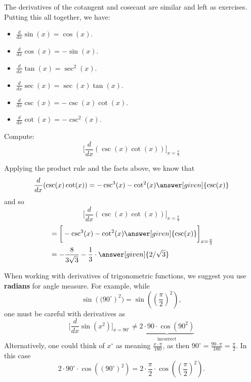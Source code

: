 \documentclass{ximera}
\begin{document}
The derivatives of the cotangent and cosecant are similar and left as
exercises.  Putting this all together, we have:

\begin{theorem} \hfil
\begin{itemize}
\item $\frac{d}{dx} \sin(x) = \cos(x)$.
\item $\frac{d}{dx} \cos(x) = -\sin(x)$.
\item $\frac{d}{dx} \tan(x) = \sec^2(x)$.
\item $\frac{d}{dx} \sec(x) = \sec(x)\tan(x)$.
\item $\frac{d}{dx} \csc(x) = -\csc(x)\cot(x)$.
\item $\frac{d}{dx} \cot(x) = -\csc^2(x)$.
\end{itemize}
\end{theorem}

\begin{example}
Compute:
\[
\bigg[ \frac{d}{dx} ( \csc(x) \cot(x) ) \bigg]_{x=\frac{\pi}{3}}
\]
\begin{explanation}
Applying the product rule and the facts above, we know that
\[
\frac{d}{dx} ( \csc(x) \cot(x) ) = - \csc^3(x) - \cot^2(x)\answer[given]{\csc(x)}
\]
and so
\[
\bigg[ \frac{d}{dx} ( \csc(x) \cot(x) ) \bigg]_{x=\frac{\pi}{3}}
\]
\begin{align*}
  &= \bigg[   - \csc^3(x) - \cot^2(x) \answer[given]{\csc(x)} \bigg]_{x=\frac{\pi}{3}}  \\
&= - \frac{8}{3 \sqrt{3}} - \frac{1}{3}\cdot \answer[given]{2/\sqrt{3}}
\end{align*}
\end{explanation}
\end{example}


\begin{warning}
When working with derivatives of trigonometric functions, we suggest
you use \textbf{radians} for angle measure. For example, while
\[
\sin\left((90^\circ\right)^2) = \sin\left(\left(\frac{\pi}{2}\right)^2\right),
\]
one must be careful with derivatives as
\[
\bigg[ \frac{d}{dx} \sin\left(x^2\right) \bigg]_{x=90^\circ} \ne \underbrace{2\cdot 90\cdot \cos(90^2)}_{\text{incorrect}}
\]
Alternatively, one could think of $x^\circ$ as meaning
$\frac{x\cdot\pi}{180}$, as then $90^\circ = \frac{90\cdot\pi}{180} =
\frac{\pi}{2}$. In this case
\[
2\cdot 90^\circ\cdot \cos((90^\circ)^2) = 2\cdot \frac{\pi}{2}\cdot\cos\left(\left(\frac{\pi}{2}\right)^2\right).
\]
\end{warning}
\end{document}

